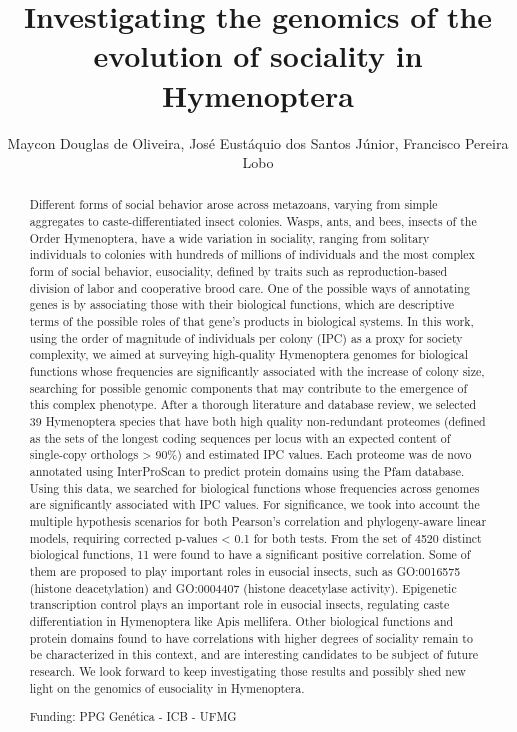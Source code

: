 \documentclass[twoside]{article}
\title{\vspace{-15mm}\fontsize{24pt}{10pt}\selectfont\textbf{ Investigating the genomics of the evolution of sociality in Hymenoptera }} %
\author{ Maycon Douglas de Oliveira, Jos\'e Eust\'aquio dos Santos J\'unior, Francisco Pereira Lobo }
\affil{ Universidade Federal de Minas Gerais }
\date{}
\begin{document}
  
  
  \maketitle %
  
  
  \thispagestyle{fancy} %
  
  
  \begin{abstract}
  Different forms of social behavior arose across metazoans,  varying from simple aggregates to caste-differentiated insect colonies. Wasps,  ants,  and bees,  insects of the Order Hymenoptera,  have a wide variation in sociality,  ranging from solitary individuals to colonies with hundreds of millions of individuals and the most complex form of social behavior,  eusociality,  defined by traits such as reproduction-based division of labor and cooperative brood care. One of the possible ways of annotating genes is by associating those with their biological functions,  which are descriptive terms of the possible roles of that gene’s products in biological systems. In this work,  using the order of magnitude of individuals per colony (IPC) as a proxy for society complexity,  we aimed at surveying high-quality Hymenoptera genomes for biological functions whose frequencies are significantly associated with the increase of colony size,  searching for possible genomic components that may contribute to the emergence of this complex phenotype. After a thorough literature and database review,  we selected 39 Hymenoptera species that have both high quality non-redundant proteomes (defined as the sets of the longest coding sequences per locus with an expected content of single-copy orthologs > 90\%) and estimated IPC values. Each proteome was de novo annotated using InterProScan to predict protein domains using the Pfam database. Using this data,  we searched for biological functions whose frequencies across genomes are significantly associated with IPC values. For significance,  we took into account the multiple hypothesis scenarios for both Pearson's correlation and phylogeny-aware linear models,  requiring corrected p-values < 0.1 for both tests. From the set of 4520 distinct biological functions,  11 were found to have a significant positive correlation. Some of them are proposed to play important roles in eusocial insects,  such as GO:0016575 (histone deacetylation) and GO:0004407 (histone deacetylase activity). Epigenetic transcription control plays an important role in eusocial insects,  regulating caste differentiation in Hymenoptera like Apis mellifera. Other biological functions and protein domains found to have correlations with higher degrees of sociality remain to be characterized in this context,  and are interesting candidates to be subject of future research. We look forward to keep investigating those results and possibly shed new light on the genomics of eusociality in Hymenoptera.
  
  Funding: PPG Gen\'etica - ICB - UFMG \\ 
  \end{abstract}
  
\end{document}
